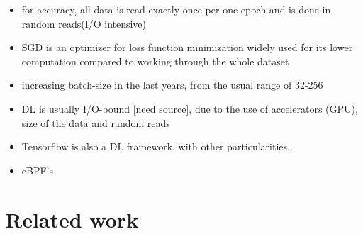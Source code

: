 \documentclass[conference]{IEEEtran}
\begin{document}
\begin{itemize}
    


    \item for accuracy, all data is read exactly once per one epoch and is done in random reads(I/O intensive)
    \item SGD is an optimizer for loss function minimization widely used for its lower computation compared to working through the whole dataset 
    \item increasing batch-size in the last years, from the usual range of 32-256 \cite{nvme}
    \item DL is usually I/O-bound [need source], due to the use of accelerators (GPU), size of the data and random reads
    \item Tensorflow is also a DL framework, with other particularities...
    \item eBPF's
\end{itemize}

\section{Related work}
\end{document}
